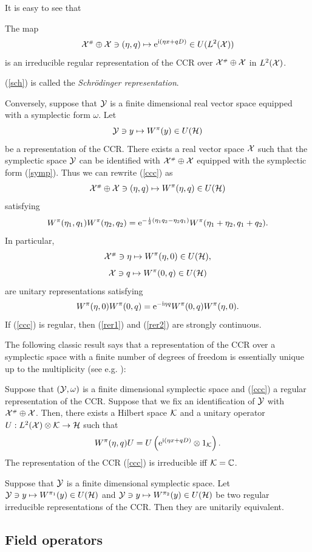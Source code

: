 \documentclass{svmult}
\newcommand{\beq}{\begin{equation}}
\newcommand{\eeq}{\end{equation}}
\def\bet{\begin{theorem}}
\def\eet{\end{theorem}}
\def\cc{{\mathbb C}}
\def\cY{{\cal Y}}
\def\i{{\rm i}}
\def\e{{\rm e}}
\def\cH{{\cal H}}
\def\cX{{\cal X}}
\def\cK{{\cal K}}
\def\e{{\rm e}}
\def\cH{{\cal H}}
\def\t{{\scriptscriptstyle\#}}
\begin{document}
It is easy to see that
\bet The map
\beq\cX^\t\oplus\cX\ni(\eta,q)\mapsto\e^{\i(\eta x+q D)}\in
 U(L^2(\cX))\label{sch}\eeq 
is an irreducible  regular representation of the CCR over $\cX^\t\oplus\cX$ in
$L^2(\cX)$.
\eet

(\ref{sch}) is  called the {\em Schr\"odinger representation}. 



Conversely, suppose that $\cY$ is a finite dimensional real vector space
equipped with a 
symplectic form $\omega$. Let
\beq \cY\ni y\mapsto W^\pi(y)\in U(\cH)\label{ccc}\eeq
be a  representation of the  CCR.
There exists a real vector space $\cX$ such that the symplectic space
$\cY$ can be identified with
$\cX^\t\oplus\cX$ equipped with the symplectic form (\ref{symp}).
 Thus we can rewrite (\ref{ccc}) as
\[\cX^\t\oplus\cX\ni(\eta,q)\mapsto W^\pi(\eta,q)\in U(\cH)\]
satisfying
\[W^\pi(\eta_1,q_1)W^\pi(\eta_2,q_2)=\e^{-\frac{\i}{2}(\eta_1 q_2-\eta_2 q_1)}
W^\pi(\eta_1+\eta_2,q_1+q_2).\]
In particular,
\beq\cX^\t\ni\eta\mapsto  W^\pi(\eta,0)\in U(\cH),\label{rer1}\eeq
\beq\cX\ni q\mapsto W^\pi(0,q)\in U(\cH)\label{rer2}\eeq
are  unitary representations satisfying
\[W^\pi(\eta,0)W^\pi(0,q)=\e^{-\i\eta q}W^\pi(0,q)W^\pi(\eta,0).\]
If (\ref{ccc}) is regular, then (\ref{rer1}) and (\ref{rer2}) are strongly
continuous. 


The following classic result says that a  representation of the   CCR over a
symplectic space with a finite number of degrees of freedom is essentially
unique up to the multiplicity (see e.g. \cite{BR2,Em}):
\bet[The Stone--von Neumann theorem]
Suppose that $(\cY,\omega)$ is a finite dimensional 
symplectic space and (\ref{ccc}) a regular representation of the  CCR.
Suppose that we fix an identification
of $\cY$ with
$\cX^\t\oplus\cX$. 
Then, there exists a Hilbert space
$\cK$ and a unitary operator
$U: L^2(\cX)\otimes\cK\to \cH$
such that
\[W^\pi(\eta,q)U=U\left(\e^{\i(\eta x+q D)}\otimes 1_\cK\right) .\]
The representation of the CCR (\ref{ccc})
is irreducible iff $\cK=\cc$. \label{stvn}\eet

\begin{corollary} Suppose that $\cY$ is a 
finite dimensional symplectic space. Let
$\cY\ni y\mapsto W^{\pi_1}(y)\in U(\cH)$ and
$\cY\ni y\mapsto W^{\pi_2}(y)\in U(\cH)$ be two regular irreducible
representations of the CCR. Then they are unitarily equivalent.
\label{cosa}
\end{corollary}



\subsection{Field operators}
\end{document}

